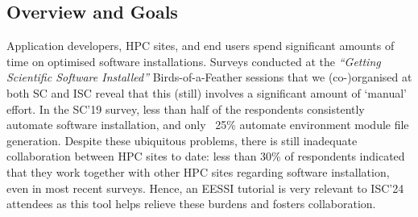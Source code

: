 

\subsection*{Overview and Goals}

Application developers, HPC sites, and end users %
spend significant amounts of time on optimised software installations. Surveys conducted at the
\emph{``Getting Scientific Software Installed''} Birds-of-a-Feather sessions that we (co-)organised at both SC and ISC
reveal that this (still) involves a significant amount of `manual' effort.
In the SC'19 survey,
less than half of the respondents consistently automate software installation,
and only ~25\% automate environment module file generation.
Despite these ubiquitous problems,
there is still inadequate collaboration
between HPC sites to date: less than 30\% of respondents indicated that they
work together with other HPC sites regarding software installation, even in most recent surveys.
Hence, an EESSI tutorial is very relevant to ISC'24 attendees as this tool helps relieve these burdens and fosters
collaboration.

